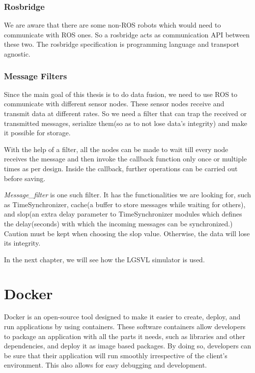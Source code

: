 \subsubsection*{Rosbridge}
We are aware that there are some non-ROS robots which would need to communicate with ROS
ones. So a rosbridge \cite{rosbridge} acts as communication API between these two. The rosbridge
specification is programming language and transport agnostic.

\subsubsection*{Message Filters}
Since the main goal of this thesis is to do data fusion, we need to use ROS to communicate
with different sensor nodes. These sensor nodes receive and transmit data at different rates.
So we need a filter that can trap the received or transmitted messages, serialize them(so
as to not lose data's integrity) and make it possible for storage.

With the help of a filter, all the nodes can be made to wait till every node receives the message and then
invoke the callback function only once or multiple times as per design. Inside the callback, further operations can be
carried out before saving.

\textit{Message\_filter} \cite{messagefilters} is one such filter. It has the
functionalities we are looking for, such as TimeSynchronizer, cache(a buffer to store
messages while waiting for others), and slop(an extra delay parameter to TimeSynchronizer
modules which defines the delay(seconds) with which the incoming messages can be
synchronized.) Caution must be kept when choosing the slop value. Otherwise, the data will
lose its integrity.

In the next chapter, we will see how the LGSVL \cite{rong2020lgsvl} simulator is used.

\section{Docker}
Docker \cite{dockergettingstarted} is an open-source tool designed to make it easier to create, deploy, and run applications by
using containers. These software containers allow developers to package an application
with all the parts it needs, such as libraries and other dependencies, and deploy it as
image based packages. By doing so, developers can be sure that their application will run smoothly
irrespective of the client's environment. This also allows for easy debugging and
development.

